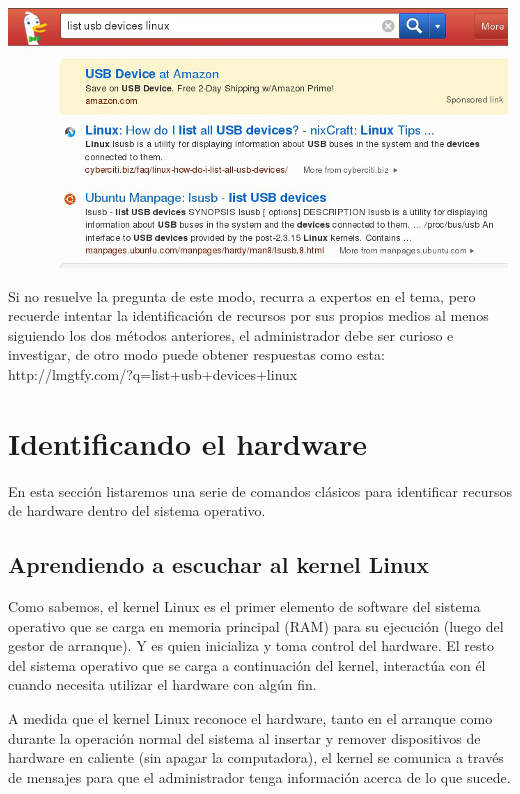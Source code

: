 \documentclass[12pt]{article}
\begin{document}
\begin{center}
 \includegraphics{lsusb.jpg}
\end{center}

Si no resuelve la pregunta de este modo, recurra a expertos en el tema, pero recuerde
intentar la identificación de recursos por sus propios medios al menos siguiendo los dos 
métodos anteriores, el administrador debe ser curioso e investigar, de otro modo puede 
obtener respuestas como esta: http://lmgtfy.com/?q=list+usb+devices+linux

\section*{Identificando el hardware}
En esta sección listaremos una serie de comandos clásicos para identificar recursos de
hardware dentro del sistema operativo. 

\subsection*{Aprendiendo a escuchar al kernel Linux}

Como sabemos, el kernel Linux es el primer elemento de software del sistema operativo 
que se carga en memoria principal (RAM) para su ejecución (luego del gestor de arranque). 
Y es quien inicializa y toma control del hardware. 
El resto del sistema operativo que se carga a continuación del kernel, interactúa con él 
cuando necesita utilizar el hardware con algún fin. 

A medida que el kernel Linux reconoce el hardware, tanto en el arranque como durante la 
operación normal del sistema al insertar y remover dispositivos de hardware 
en caliente (sin apagar la computadora), el kernel se comunica a través de mensajes para 
que el administrador tenga información acerca de lo que sucede. 
\end{document}
